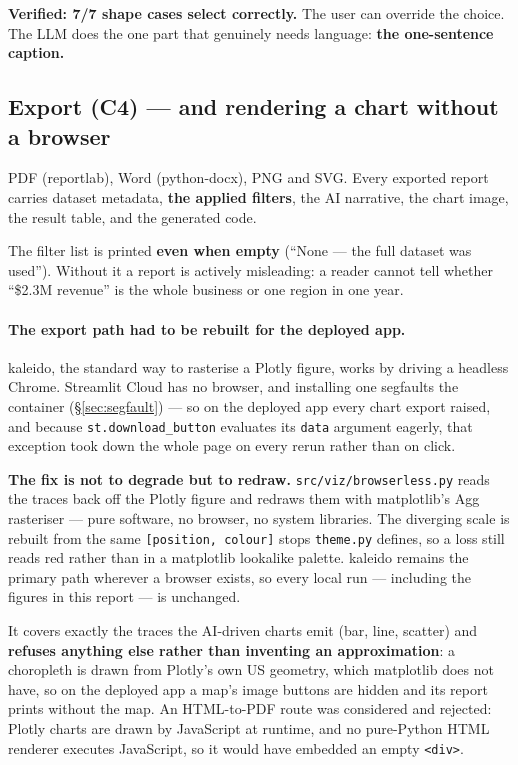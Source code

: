 \documentclass[11pt,a4paper]{article}
\begin{document}
\textbf{Verified: 7/7 shape cases select correctly.} The user can override the choice.
The LLM does the one part that genuinely needs language: \textbf{the one-sentence
caption.}

\subsection{Export (C4) --- and rendering a chart without a browser}
\label{sec:export}

PDF (reportlab), Word (python-docx), PNG and SVG. Every exported report carries dataset
metadata, \textbf{the applied filters}, the AI narrative, the chart image, the result
table, and the generated code.

The filter list is printed \textbf{even when empty} (``None --- the full dataset was
used''). Without it a report is actively misleading: a reader cannot tell whether
``\$2.3M revenue'' is the whole business or one region in one year.

\paragraph{The export path had to be rebuilt for the deployed app.} kaleido, the
standard way to rasterise a Plotly figure, works by driving a headless Chrome. Streamlit
Cloud has no browser, and installing one segfaults the container
(\S\ref{sec:segfault}) --- so on the deployed app every chart export raised, and because
\texttt{st.download\_button} evaluates its \texttt{data} argument eagerly, that
exception took down the whole page on every rerun rather than on click.

\textbf{The fix is not to degrade but to redraw.} \texttt{src/viz/browserless.py} reads
the traces back off the Plotly figure and redraws them with matplotlib's Agg
rasteriser --- pure software, no browser, no system libraries. The diverging scale is
rebuilt from the same \texttt{[position, colour]} stops \texttt{theme.py} defines, so a
loss still reads red rather than in a matplotlib lookalike palette. kaleido remains the
primary path wherever a browser exists, so every local run --- including the figures in
this report --- is unchanged.

It covers exactly the traces the AI-driven charts emit (bar, line, scatter) and
\textbf{refuses anything else rather than inventing an approximation}: a choropleth is
drawn from Plotly's own US geometry, which matplotlib does not have, so on the deployed
app a map's image buttons are hidden and its report prints without the map. An HTML-to-PDF
route was considered and rejected: Plotly charts are drawn by JavaScript at runtime, and
no pure-Python HTML renderer executes JavaScript, so it would have embedded an empty
\texttt{<div>}.
\end{document}
